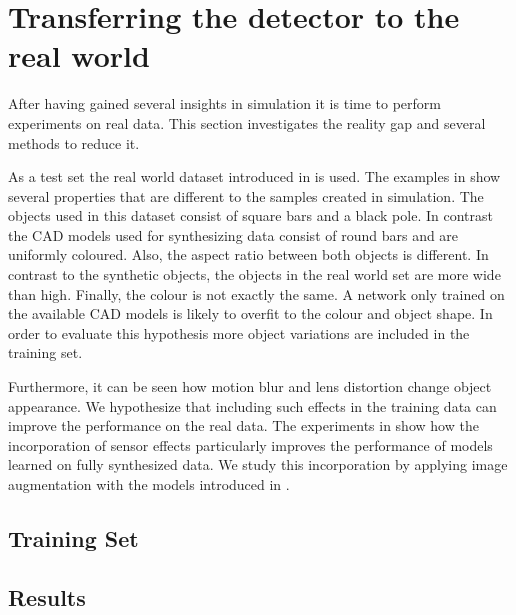 


\section{Transferring the detector to the real world}

After having gained several insights in simulation it is time to perform experiments on real data. This section investigates the reality gap and several methods to reduce it.

As a test set the real world dataset introduced in  is used. The examples in  show several properties that are different to the samples created in simulation. The objects used in this dataset consist of square bars and a black pole. In contrast the \ac{CAD} models used for synthesizing data consist of round bars and are uniformly coloured. Also, the aspect ratio between both objects is different. In contrast to the synthetic objects, the objects in the real world set are more wide than high. Finally, the colour is not exactly the same. A network only trained on the available \ac{CAD} models is likely to overfit to the colour and object shape. In order to evaluate this hypothesis more object variations are included in the training set.

Furthermore, it can be seen how motion blur and lens distortion change object appearance. We hypothesize that including such effects in the training data can improve the performance on the real data. The experiments in \cite{Carlson2018} show how the incorporation of sensor effects particularly improves the performance of models learned on fully synthesized data. We study this incorporation by applying image augmentation with the models introduced in .

\subsection{Training Set}

\subsection{Results}

